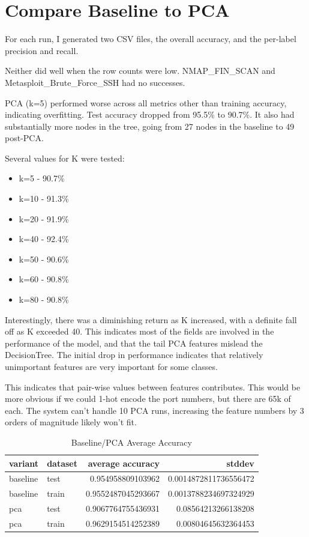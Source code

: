 \documentclass[11pt]{article}
\begin{document}
\section{Compare Baseline to PCA}

For each run, I generated two CSV files, the overall accuracy, and the per-label precision and recall.

Neither did well when the row counts were low. NMAP\_FIN\_SCAN and Metasploit\_Brute\_Force\_SSH had no successes.

PCA (k=5) performed worse across all metrics other than training accuracy, indicating overfitting. Test accuracy dropped from 95.5\% to 90.7\%. It also had substantially more nodes in the tree, going from 27 nodes in the baseline to 49 post-PCA.

Several values for K were tested:

\begin{itemize}[nosep]
	\item k=5 - 90.7\%
	\item k=10 - 91.3\%
	\item k=20 - 91.9\%
	\item k=40 - 92.4\%
	\item k=50 - 90.6\%
	\item k=60 - 90.8\%
	\item k=80 - 90.8\%
\end{itemize}

Interestingly, there was a diminishing return as K increased, with a definite fall off as K exceeded 40. This indicates most of the fields are involved in the performance of the model, and that the tail PCA features mislead the DecisionTree. The initial drop in performance indicates that relatively unimportant features are very important for some classes.

This indicates that pair-wise values between features contributes. This would be more obvious if we could 1-hot encode the port numbers, but there are 65k of each. The system can't handle 10 PCA runs, increasing the feature numbers by 3 orders of magnitude likely won't fit.

\begin{table}[H]
	\centering
	\begin{tabular}{ | l | l | r | r | }
		\hline
		\textbf{variant} & \textbf{dataset} & \textbf{average accuracy} & \textbf{stddev} \\
		\hline
		baseline & test & 0.954958809103962 & 0.0014872811736556472 \\
		\hline
		baseline & train & 0.9552487045293667 & 0.0013788234697324929 \\
		\hline
		pca & test & 0.9067764755436931 & 0.08564213266138208 \\
		\hline
		pca & train & 0.9629154514252389 & 0.00804645632364453 \\
		\hline
	\end{tabular}
	\caption{Baseline/PCA Average Accuracy}
\end{table}	
\end{document}
